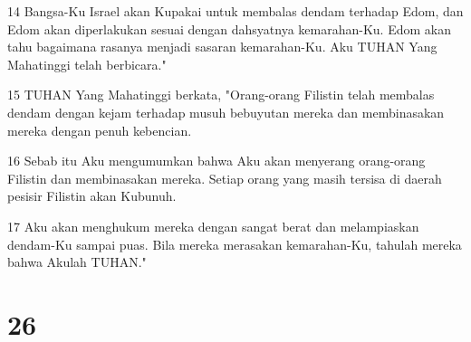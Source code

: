 \par 14 Bangsa-Ku Israel akan Kupakai untuk membalas dendam terhadap Edom, dan Edom akan diperlakukan sesuai dengan dahsyatnya kemarahan-Ku. Edom akan tahu bagaimana rasanya menjadi sasaran kemarahan-Ku. Aku TUHAN Yang Mahatinggi telah berbicara."
\par 15 TUHAN Yang Mahatinggi berkata, "Orang-orang Filistin telah membalas dendam dengan kejam terhadap musuh bebuyutan mereka dan membinasakan mereka dengan penuh kebencian.
\par 16 Sebab itu Aku mengumumkan bahwa Aku akan menyerang orang-orang Filistin dan membinasakan mereka. Setiap orang yang masih tersisa di daerah pesisir Filistin akan Kubunuh.
\par 17 Aku akan menghukum mereka dengan sangat berat dan melampiaskan dendam-Ku sampai puas. Bila mereka merasakan kemarahan-Ku, tahulah mereka bahwa Akulah TUHAN."

\chapter{26}

